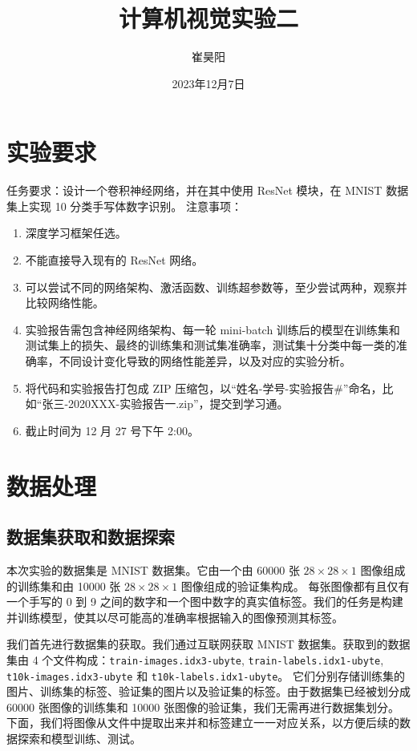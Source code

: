 \documentclass[supercite]{Experimental_Report}
\title{~~~~~~计算机视觉实验二~~~~~~}
\author{崔昊阳}
\date{2023年12月7日}
\theoremstyle{definition}
\begin{document}
\maketitle

\clearpage


\tableofcontents[level=2]

\clearpage


\section{实验要求}
任务要求：设计一个卷积神经网络，并在其中使用 ResNet 模块，在 MNIST 数据集上实现 10 分类手写体数字识别。
注意事项：
\begin{enumerate}
	\item 深度学习框架任选。
	\item 不能直接导入现有的 ResNet 网络。
	\item 可以尝试不同的网络架构、激活函数、训练超参数等，至少尝试两种，观察并比较网络性能。
	\item 实验报告需包含神经网络架构、每一轮 mini-batch 训练后的模型在训练集和测试集上的损失、最终的训练集和测试集准确率，测试集十分类中每一类的准确率，不同设计变化导致的网络性能差异，以及对应的实验分析。
	\item 将代码和实验报告打包成 ZIP 压缩包，以“姓名-学号-实验报告\#”命名，比如“张三-2020XXX-实验报告一.zip”，提交到学习通。
	\item 截止时间为 12 月 27 号下午 2:00。
\end{enumerate}

\section{数据处理}
\subsection{数据集获取和数据探索}
本次实验的数据集是 MNIST 数据集。它由一个由 60000 张 $28\times 28\times 1$ 图像组成的训练集和由 10000 张 $28\times 28\times 1$ 图像组成的验证集构成。
每张图像都有且仅有一个手写的 0 到 9 之间的数字和一个图中数字的真实值标签。我们的任务是构建并训练模型，使其以尽可能高的准确率根据输入的图像预测其标签。

我们首先进行数据集的获取。我们通过互联网获取 MNIST 数据集。获取到的数据集由 4 个文件构成：\texttt{train-images.idx3-ubyte}, \texttt{train-labels.idx1-ubyte}, \texttt{t10k-images.idx3-ubyte} 和 \texttt{t10k-labels.idx1-ubyte}。
它们分别存储训练集的图片、训练集的标签、验证集的图片以及验证集的标签。由于数据集已经被划分成 60000 张图像的训练集和 10000 张图像的验证集，我们无需再进行数据集划分。
下面，我们将图像从文件中提取出来并和标签建立一一对应关系，以方便后续的数据探索和模型训练、测试。
\end{document}
